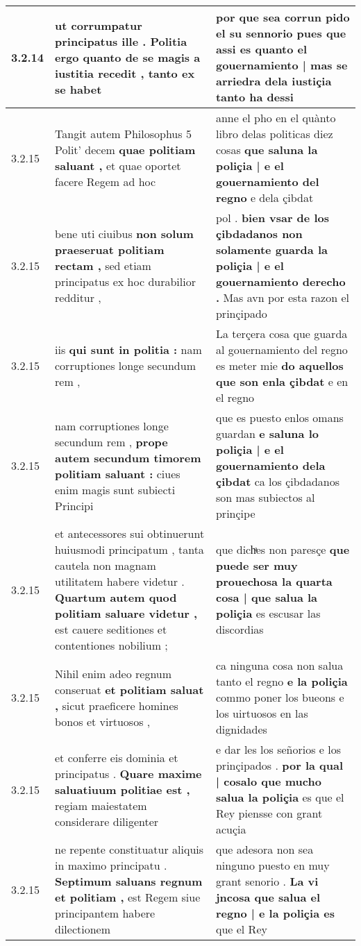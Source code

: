 \begin{tabular}{|p{1cm}|p{6.5cm}|p{6.5cm}|}
3.2.14 & ut corrumpatur principatus ille . \textbf{ Politia ergo quanto de se magis a iustitia recedit , } tanto ex se habet & por que sea corrun pido el su sennorio \textbf{ pues que assi es quanto el gouernamiento | mas se arriedra dela iustiçia } tanto ha dessi \\\hline
3.2.15 & Tangit autem Philosophus 5 Polit’ decem \textbf{ quae politiam saluant , } et quae oportet facere Regem ad hoc & anne el pho en el quànto libro delas politicas diez cosas \textbf{ que saluna la poliçia | e el gouernamiento del regno } e dela çibdat \\\hline
3.2.15 & bene uti ciuibus \textbf{ non solum praeseruat politiam rectam , } sed etiam principatus ex hoc durabilior redditur , & pol . \textbf{ bien vsar de los çibdadanos non solamente guarda la poliçia | e el gouernamiento derecho . } Mas avn por esta razon el prinçipado \\\hline
3.2.15 & iis \textbf{ qui sunt in politia : } nam corruptiones longe secundum rem , & La terçera cosa que guarda al gouernamiento del regno es meter mie \textbf{ do aquellos que son enla çibdat } e en el regno \\\hline
3.2.15 & nam corruptiones longe secundum rem , \textbf{ prope autem secundum timorem politiam saluant : } ciues enim magis sunt subiecti Principi & que es puesto enlos omans guardan \textbf{ e saluna lo poliçia | e el gouernamiento dela çibdat } ca los çibdadanos son mas subiectos al prinçipe \\\hline
3.2.15 & et antecessores sui obtinuerunt huiusmodi principatum , tanta cautela non magnam utilitatem habere videtur . \textbf{ Quartum autem quod politiam saluare videtur , } est cauere seditiones et contentiones nobilium ; & que dichͣes non paresçe \textbf{ que puede ser muy prouechosa la quarta cosa | que salua la poliçia } es escusar las discordias \\\hline
3.2.15 & Nihil enim adeo regnum conseruat \textbf{ et politiam saluat , } sicut praeficere homines bonos et virtuosos , & ca ninguna cosa non salua tanto el regno \textbf{ e la poliçia } commo poner los bueons e los uirtuosos en las dignidades \\\hline
3.2.15 & et conferre eis dominia et principatus . \textbf{ Quare maxime saluatiuum politiae est , } regiam maiestatem considerare diligenter & e dar les los señorios e los prinçipados . \textbf{ por la qual | cosalo que mucho salua la poliçia } es que el Rey piensse con grant acuçia \\\hline
3.2.15 & ne repente constituatur aliquis in maximo principatu . \textbf{ Septimum saluans regnum et politiam , } est Regem siue principantem habere dilectionem & que adesora non sea ninguno puesto en muy grant senorio . \textbf{ La vi jncosa que salua el regno | e la poliçia es } que el Rey \\\hline

\end{tabular}
